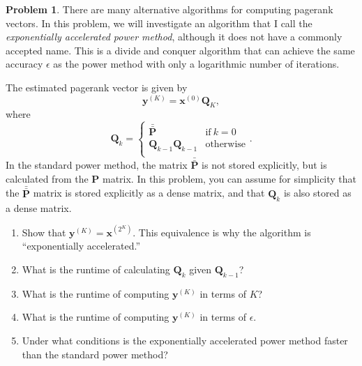 \documentclass[10pt]{article}
\theoremstyle{definition}
\newtheorem{problem}{Problem}
\newcommand{\Q}{\mathbf Q}
\newcommand{\p}{\mathbf P}
\newcommand{\pb}{\bar {\p}}
\newcommand{\pbb}{\bar {\pb}}
\newcommand{\x}{\mathbf x}
\newcommand{\y}{\mathbf y}
\begin{document}
\newpage
\begin{problem}
    There are many alternative algorithms for computing pagerank vectors.
    In this problem, we will investigate an algorithm that I call the \emph{exponentially accelerated power method},
    although it does not have a commonly accepted name.
    This is a divide and conquer algorithm that can achieve the same accuracy $\epsilon$ as the power method with only a logarithmic number of iterations.

    The estimated pagerank vector is given by
    \begin{equation}
        \y^{(K)} = \x^{(0)} \Q_K
        ,
    \end{equation}
    where
    \begin{equation}
        \Q_k = 
        \begin{cases}
            \pbb & \text{if}~k=0 \\
            \Q_{k-1} \Q_{k-1} & \text{otherwise} \\
        \end{cases}
        .
    \end{equation}
    In the standard power method, the matrix $\pbb$ is not stored explicitly,
    but is calculated from the $\p$ matrix.
    In this problem, you can assume for simplicity that the $\pbb$ matrix is stored explicitly as a dense matrix,
    and that $\Q_k$ is also stored as a dense matrix.

    \begin{enumerate}
        \item
            Show that $\y^{(K)} = \x^{(2^K)}$.
            This equivalence is why the algorithm is ``exponentially accelerated.''
            \vspace{3in}

        \item
            What is the runtime of calculating $\Q_k$ given $\Q_{k-1}$? 
            \vspace{4in}

        \item 
            What is the runtime of computing $\y^{(K)}$ in terms of $K$?
            \vspace{4.5in}

        \item
            What is the runtime of computing $\y^{(K)}$ in terms of $\epsilon$.
            \vspace{4.5in}

        \item
            Under what conditions is the exponentially accelerated power method faster than the standard power method?
            \vspace{3in}


\end{enumerate}
\end{problem}
\end{document}
